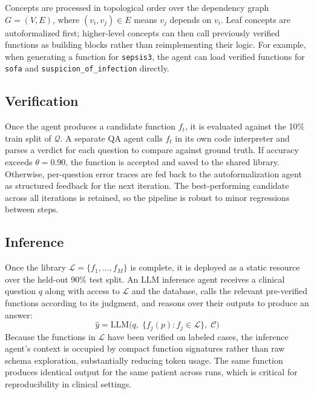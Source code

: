 Concepts are processed in topological order over the dependency graph $G = (V, E)$, where $(v_i, v_j) \in E$ means $v_j$ depends on $v_i$. Leaf concepts are autoformalized first; higher-level concepts can then call previously verified functions as building blocks rather than reimplementing their logic. For example, when generating a function for \texttt{sepsis3}, the agent can load verified functions for \texttt{sofa} and \texttt{suspicion\_of\_infection} directly.

\subsection{Verification}

Once the agent produces a candidate function $f_t$, it is evaluated against the 10\% train split of $\mathcal{Q}$. A separate QA agent calls $f_t$ in its own code interpreter and parses a verdict for each question to compare against ground truth. If accuracy exceeds $\theta = 0.90$, the function is accepted and saved to the shared library. Otherwise, per-question error traces are fed back to the autoformalization agent as structured feedback for the next iteration. The best-performing candidate across all iterations is retained, so the pipeline is robust to minor regressions between steps.

\subsection{Inference}

Once the library $\mathcal{L} = \{f_1, \dots, f_M\}$ is complete, it is deployed as a static resource over the held-out 90\% test split. An LLM inference agent receives a clinical question $q$ along with access to $\mathcal{L}$ and the database, calls the relevant pre-verified functions according to its judgment, and reasons over their outputs to produce an answer:
\begin{equation}
    \hat{y} = \text{LLM}\bigl(q,\; \{f_j(p) : f_j \in \mathcal{L}\},\; \mathcal{C}\bigr)
\end{equation}
Because the functions in $\mathcal{L}$ have been verified on labeled cases, the inference agent's context is occupied by compact function signatures rather than raw schema exploration, substantially reducing token usage. The same function produces identical output for the same patient across runs, which is critical for reproducibility in clinical settings.
